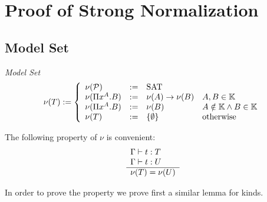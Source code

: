 \section{Proof of Strong Normalization}


\subsection{Model Set}

\begin{definition}
    \emph{Model Set}
    $$
        \nu(T) :=
        \left \{
        \begin{array}{llll}
            \nu({\cal P}) &:=& \text{SAT}
            \\
            \nu(\Pi x^A. B) &:=& \nu(A)\to \nu(B) & A,B \in \mathbb{K}
            \\
            \nu(\Pi x^A. B) &:=& \nu(B) & A \notin \mathbb{K} \land B \in \mathbb{K}
            \\
            \nu (T) &:=& {\{\emptyset\}} &\text{otherwise}
        \end{array}
        \right.
    $$
\end{definition}


The following property of $\nu$ is convenient:
$$
    \begin{array}{l} 
        \Gamma \vdash t: T
        \\
        \Gamma \vdash t: U
     \\ \hline 
        \nu(T) = \nu(U)
    \end{array}
$$


In order to prove the property we prove first a similar lemma for kinds.

